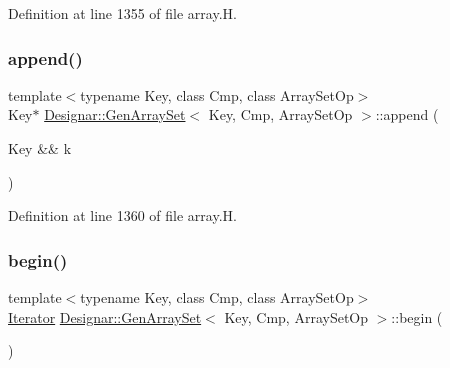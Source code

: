 Definition at line 1355 of file array.\+H.

\mbox{\label{class_designar_1_1_gen_array_set_aafb9d33d1a9a6f5b07d434705290b7bc}} 
\subsubsection{\texorpdfstring{append()}{append()}\hspace{0.1cm}{\footnotesize\ttfamily [2/2]}}
{\footnotesize\ttfamily template$<$typename Key, class Cmp, class Array\+Set\+Op$>$ \\
Key$\ast$ \hyperlink{class_designar_1_1_gen_array_set}{Designar\+::\+Gen\+Array\+Set}$<$ Key, Cmp, Array\+Set\+Op $>$\+::append (\begin{DoxyParamCaption}\item[{Key \&\&}]{k }\end{DoxyParamCaption})\hspace{0.3cm}{\ttfamily [inline]}}



Definition at line 1360 of file array.\+H.

\mbox{\label{class_designar_1_1_gen_array_set_af736c7af596752d636881374f0d45f4c}} 
\subsubsection{\texorpdfstring{begin()}{begin()}\hspace{0.1cm}{\footnotesize\ttfamily [1/2]}}
{\footnotesize\ttfamily template$<$typename Key, class Cmp, class Array\+Set\+Op$>$ \\
\hyperlink{class_designar_1_1_gen_array_set_1_1_iterator}{Iterator} \hyperlink{class_designar_1_1_gen_array_set}{Designar\+::\+Gen\+Array\+Set}$<$ Key, Cmp, Array\+Set\+Op $>$\+::begin (\begin{DoxyParamCaption}{ }\end{DoxyParamCaption})\hspace{0.3cm}{\ttfamily [inline]}}



